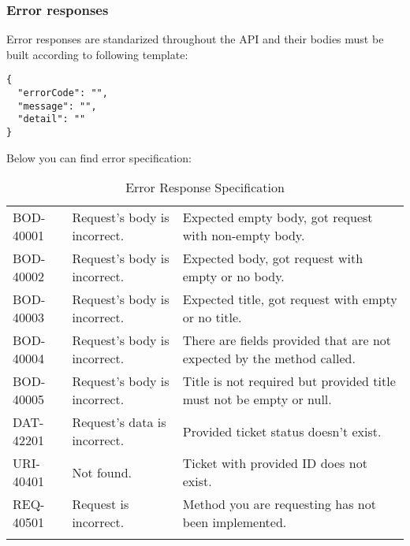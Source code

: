 \documentclass[a4paper]{article}
\begin{document}
    \subsubsection{Error responses}
    Error responses are standarized throughout the API and their bodies must be built according to following template:
    \begin{verbatim}
{
  "errorCode": "",
  "message": "",
  "detail": ""
}
    \end{verbatim}
    Below you can find error specification:
    \begin{table}[htbp]
        \centering
        \caption{Error Response Specification}
        \begin{tabularx}{\linewidth}{|l|X|X|}
            \hline
            \centering{Error Code} & \centering{Message}          & \centering{Detail}                                                    \tabularnewline \hline
            BOD-40001              & Request's body is incorrect. & Expected empty body, got request with non-empty body.                 \tabularnewline \hline
            BOD-40002              & Request's body is incorrect. & Expected body, got request with empty or no body.                     \tabularnewline \hline
            BOD-40003              & Request's body is incorrect. & Expected title, got request with empty or no title.                   \tabularnewline \hline
            BOD-40004              & Request's body is incorrect. & There are fields provided that are not expected by the method called. \tabularnewline \hline
            BOD-40005              & Request's body is incorrect. & Title is not required but provided title must not be empty or null.   \tabularnewline \hline
            DAT-42201              & Request's data is incorrect. & Provided ticket status doesn't exist.                                 \tabularnewline \hline
            URI-40401              & Not found.                   & Ticket with provided ID does not exist.                               \tabularnewline \hline
            REQ-40501              & Request is incorrect.        & Method you are requesting has not been implemented.                   \tabularnewline \hline
            \hfill                 & \hfill                       & \hfill                                                                \tabularnewline \hline
        \end{tabularx}
    \end{table}
\end{document}
